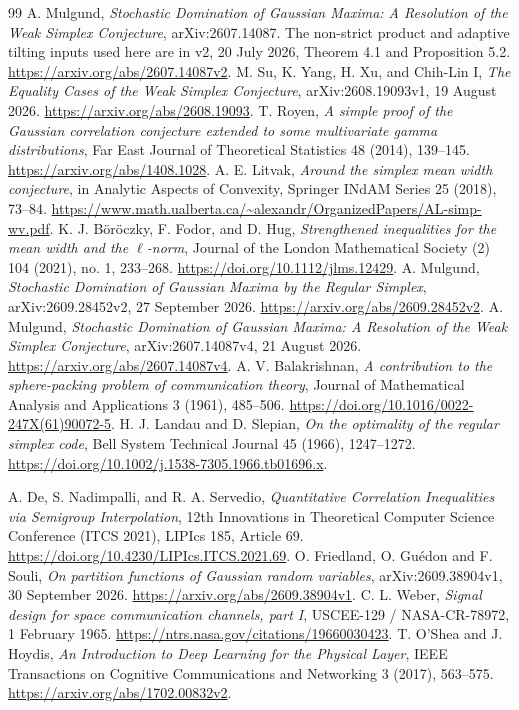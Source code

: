 \documentclass[11pt]{article}
\theoremstyle{remark}\newtheorem{remark}[theorem]{Remark}
\begin{document}
\appendix
{}




\begin{thebibliography}{99}
 A. Mulgund,
\emph{Stochastic Domination of Gaussian Maxima: A Resolution of the Weak
Simplex Conjecture}, arXiv:2607.14087. The non-strict product and adaptive
tilting inputs used here are in v2, 20 July 2026, Theorem 4.1 and Proposition 5.2.
\url{https://arxiv.org/abs/2607.14087v2}.
 M. Su, K. Yang, H. Xu, and Chih-Lin I,
\emph{The Equality Cases of the Weak Simplex Conjecture},
arXiv:2608.19093v1, 19 August 2026.
\url{https://arxiv.org/abs/2608.19093}.
 T. Royen,
\emph{A simple proof of the Gaussian correlation conjecture extended to
some multivariate gamma distributions}, Far East Journal of Theoretical
Statistics 48 (2014), 139--145. \url{https://arxiv.org/abs/1408.1028}.
 A. E. Litvak,
\emph{Around the simplex mean width conjecture}, in Analytic Aspects of
Convexity, Springer INdAM Series 25 (2018), 73--84.
\url{https://www.math.ualberta.ca/~alexandr/OrganizedPapers/AL-simp-wv.pdf}.
 K. J. B\"or\"oczky, F. Fodor, and D. Hug,
\emph{Strengthened inequalities for the mean width and the \(\ell\)-norm},
Journal of the London Mathematical Society (2) 104 (2021), no. 1, 233--268.
\url{https://doi.org/10.1112/jlms.12429}.
 A. Mulgund,
\emph{Stochastic Domination of Gaussian Maxima by the Regular Simplex},
arXiv:2609.28452v2, 27 September 2026.
\url{https://arxiv.org/abs/2609.28452v2}.
 A. Mulgund,
\emph{Stochastic Domination of Gaussian Maxima: A Resolution of the Weak
Simplex Conjecture}, arXiv:2607.14087v4, 21 August 2026.
\url{https://arxiv.org/abs/2607.14087v4}.
 A. V. Balakrishnan,
\emph{A contribution to the sphere-packing problem of communication theory},
Journal of Mathematical Analysis and Applications 3 (1961), 485--506.
\url{https://doi.org/10.1016/0022-247X(61)90072-5}.
 H. J. Landau and D. Slepian,
\emph{On the optimality of the regular simplex code},
Bell System Technical Journal 45 (1966), 1247--1272.
\url{https://doi.org/10.1002/j.1538-7305.1966.tb01696.x}.

 A. De, S. Nadimpalli, and R. A. Servedio,
\emph{Quantitative Correlation Inequalities via Semigroup Interpolation},
12th Innovations in Theoretical Computer Science Conference (ITCS 2021),
LIPIcs 185, Article 69.
\url{https://doi.org/10.4230/LIPIcs.ITCS.2021.69}.
 O. Friedland, O. Gu\'edon and F. Souli,
\emph{On partition functions of Gaussian random variables},
arXiv:2609.38904v1, 30 September 2026.
\url{https://arxiv.org/abs/2609.38904v1}.
 C. L. Weber,
\emph{Signal design for space communication channels, part I},
USCEE-129 / NASA-CR-78972, 1 February 1965.
\url{https://ntrs.nasa.gov/citations/19660030423}.
 T. O'Shea and J. Hoydis,
\emph{An Introduction to Deep Learning for the Physical Layer},
IEEE Transactions on Cognitive Communications and Networking 3 (2017),
563--575. \url{https://arxiv.org/abs/1702.00832v2}.
\end{thebibliography}
\end{document}
